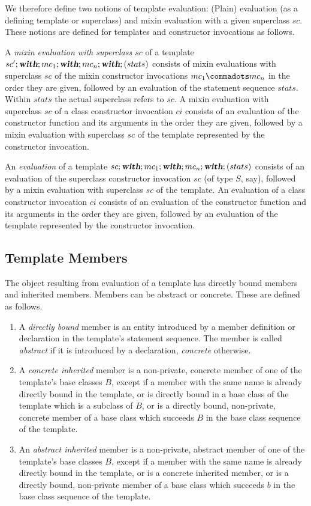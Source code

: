 \documentclass[11pt]{report}
\newcommand{\ifqualified}[1]{}
\begin{document}
\begin{itemize}
We therefore define two notions of template evaluation: (Plain)
evaluation (as a defining template or superclass) and mixin evaluation
with a given superclass $sc$. These notions are defined for templates
and constructor invocations as follows.

A {\em mixin evaluation with superclass $sc$} of a template
$sc';\mbox{\sl\bfseries with};mc_1;\mbox{\sl\bfseries with};mc_n;\mbox{\sl\bfseries with};(stats)$ consists of mixin
evaluations with superclass $sc$ of the mixin constructor invocations
$mc_1 \commadots mc_n$ in the order they are given, followed by an
evaluation of the statement sequence $stats$.  Within $stats$ the
actual superclass refers to $sc$.  A mixin evaluation with superclass
$sc$ of a class constructor invocation $ci$ consists of an evaluation
of the constructor function and its arguments in the order they are
given, followed by a mixin evaluation with superclass $sc$ of the
template represented by the constructor invocation.

An {\em evaluation} of a template
$sc;\mbox{\sl\bfseries with};mc_1;\mbox{\sl\bfseries with};mc_n;\mbox{\sl\bfseries with};(stats)$ consists of an evaluation of
the superclass constructor invocation $sc$ (of type $S$, say),
followed by a mixin evaluation with superclass $sc$ of the template. An
evaluation of a class constructor invocation $ci$ consists of an
evaluation of the constructor function and its arguments in
the order they are given, followed by an evaluation of the template
represented by the constructor invocation.

\subsection{Template Members}

\label{sec:members}

The object resulting from evaluation of a template has directly bound
members and inherited members. Members can be abstract or concrete.
These are defined as follows.
\begin{enumerate}
\item
A {\em directly bound} member is an entity introduced by a member
definition or declaration in the template's statement sequence. The
member is called {\em abstract} if it is introduced by a declaration,
{\em concrete} otherwise.
\item
A {\em concrete inherited} member is a non-private, concrete member of
one of the template's base classes $B$, except if a member with the
same \ifqualified{qualified} name is already directly bound in the template, or is
directly bound in a base class of the template which is a subclass of
$B$, or is a directly bound, non-private, concrete member of a base
class which succeeds $B$ in the base class sequence of the template.
\item
An {\em abstract inherited} member is a non-private, abstract member
of one of the template's base classes $B$, except if a member with the
same \ifqualified{qualified} name is already directly bound in the template, or is a
concrete inherited member, or is a directly bound, non-private member
of a base class which succeeds $b$ in the base class sequence of the
template.
\end{enumerate}


\end{itemize}
\end{document}
